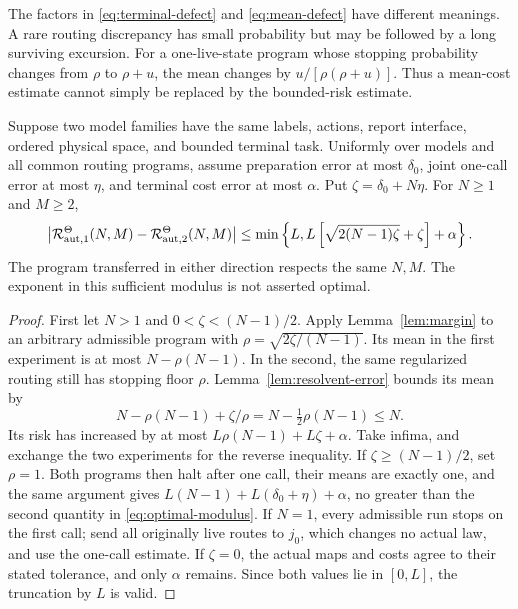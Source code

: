 The factors in \eqref{eq:terminal-defect} and \eqref{eq:mean-defect} have different meanings. A rare routing discrepancy has small probability but may be followed by a long surviving excursion. For a one-live-state program whose stopping probability changes from $\rho$ to $\rho+u$, the mean changes by $u/[\rho(\rho+u)]$. Thus a mean-cost estimate cannot simply be replaced by the bounded-risk estimate.

\begin{proposition}\label{prop:same-budget}
Suppose two model families have the same labels, actions, report interface, ordered physical space, and bounded terminal task. Uniformly over models and all common routing programs, assume preparation error at most $\delta_0$, joint one-call error at most $\eta$, and terminal cost error at most $\alpha$. Put $\zeta=\delta_0+N\eta$. For $N\ge1$ and $M\ge2$,
\begin{equation}\label{eq:optimal-modulus}
 \left|\mathcal R_{\mathrm{aut},1}^\Theta(N,M)-\mathcal R_{\mathrm{aut},2}^\Theta(N,M)\right|
 \le \min\left\{L,
 L\left[\sqrt{2(N-1)\zeta}+\zeta\right]+\alpha\right\}.
\end{equation}
The program transferred in either direction respects the same $N,M$. The exponent in this sufficient modulus is not asserted optimal.
\end{proposition}
\begin{proof}
First let $N>1$ and $0<\zeta<(N-1)/2$. Apply Lemma~\ref{lem:margin} to an arbitrary admissible program with
$\rho=\sqrt{2\zeta/(N-1)}$. Its mean in the first experiment is at most $N-\rho(N-1)$. In the second, the same regularized routing still has stopping floor $\rho$. Lemma~\ref{lem:resolvent-error} bounds its mean by
\[
 N-\rho(N-1)+\zeta/\rho
       =N-\tfrac12\rho(N-1)\le N.
\]
Its risk has increased by at most $L\rho(N-1)+L\zeta+\alpha$. Take infima, and exchange the two experiments for the reverse inequality. If $\zeta\ge(N-1)/2$, set $\rho=1$. Both programs then halt after one call, their means are exactly one, and the same argument gives $L(N-1)+L(\delta_0+\eta)+\alpha$, no greater than the second quantity in \eqref{eq:optimal-modulus}. If $N=1$, every admissible run stops on the first call; send all originally live routes to $j_0$, which changes no actual law, and use the one-call estimate. If $\zeta=0$, the actual maps and costs agree to their stated tolerance, and only $\alpha$ remains. Since both values lie in $[0,L]$, the truncation by $L$ is valid.
\end{proof}

